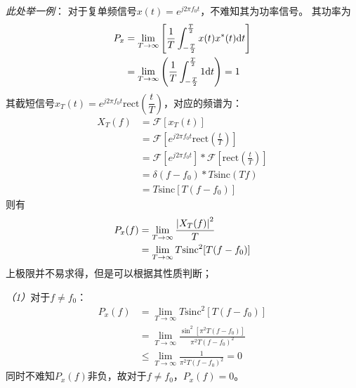     \emph{此处举一例}：
    对于复单频信号$x(t)=e^{j2\pi f_0t}$，不难知其为功率信号。
    其功率为
    \begin{equation}
        \begin{split}
            P_x &=\lim_{T\to\infty}\left[\frac{1}{T}\int_{-\frac{T}{2}}^{\frac{T}{2}}x(t)x^*(t)\text{\upshape d} t\right]\\
                &=\lim_{T\to\infty}\left(\frac{1}{T}\int_{-\frac{T}{2}}^{\frac{T}{2}}1\text{\upshape d} t\right)=1
        \end{split}
    \end{equation}
    其截短信号$x_T(t)=e^{j2\pi f_0t}\text{rect}(\dfrac{t}{T})$，对应的频谱为：
    \begin{equation}
        \begin{split}
            X_T(f)  &=\mathscr{F}[x_T(t)]\\
                    &=\mathscr{F}[e^{j2\pi f_0t}\text{rect}(\frac{t}{T})]\\
                    &=\mathscr{F}[e^{j2\pi f_0t}]*\mathscr{F}[\text{rect}(\frac{t}{T})]\\
                    &=\delta (f-f_0)*T\text{sinc}(Tf)\\
                    &=T\text{sinc}[T(f-f_0)]
        \end{split}
    \end{equation}
    则有
    \begin{equation}
        \begin{split}
            P_x(f)  &=\lim_{T\to\infty}\frac{\left\vert X_T(f) \right\vert^2}{T}\\
                    &=\lim_{T\to\infty}T\text{sinc}^2[T(f-f_0)]
        \end{split}
    \end{equation}
    上极限并不易求得，但是可以根据其性质判断；

    \emph{（1）}对于$f\neq f_0$：
    \begin{equation*}
        \begin{split}
        P_x(f)  &=\lim_{T\to\infty}T\text{sinc}^2[T(f-f_0)]\\
                &=\lim_{T\to\infty}\frac{\sin^2[\pi^2 T(f-f_0)]}{\pi^2T(f-f_0)^2}\\
                &\leq\lim_{T\to\infty}\frac{1}{\pi^2 T(f-f_0)^2}=0
        \end{split}
    \end{equation*}
    同时不难知$P_x(f)$非负，故对于$f\neq f_0$，$P_x(f)=0$。

